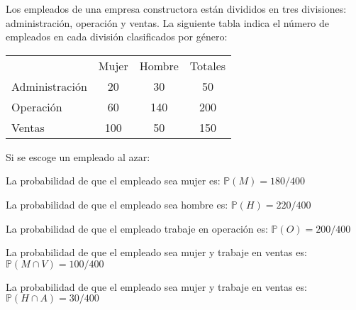 \addpoints

\question[10] Los empleados de una empresa constructora están divididos en tres divisiones: administración, operación y ventas. La siguiente tabla indica el número de empleados en cada división clasificados por género:

\begin{center}
\begin{tabular}{lccc}
           & Mujer & Hombre & Totales  \\
Administración & 20 & 30    & 50   \\
Operación & 60 & 140    & 200   \\
Ventas & 100 & 50    & 150     
\end{tabular}
\end{center}
Si se escoge un empleado al azar:\\

\noaddpoints
{}

\begin{solution}
La probabilidad de que el empleado sea mujer es: $\mathbb{P}(M)= 180/400$

La probabilidad de que el empleado sea hombre es: $\mathbb{P}(H)= 220/400$

La probabilidad de que el empleado trabaje en operación es: $\mathbb{P}(O)= 200/400$

La probabilidad de que el empleado sea mujer y trabaje en ventas es: $\mathbb{P}(M \cap V)= 100/400$

La probabilidad de que el empleado sea mujer y trabaje en ventas es: $\mathbb{P}(H \cap A)= 30/400$
\end{solution}